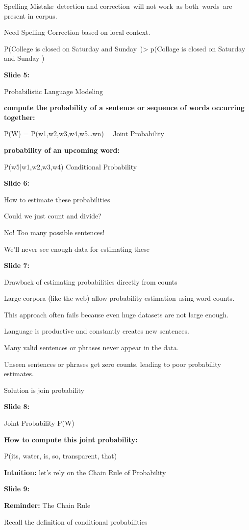 \documentclass[11pt,a4paper]{article}
\begin{document}
Spelling Mistake detection and correction will not work as both words are present in corpus.

Need Spelling Correction based on local context.

P(College is closed on Saturday and Sunday )> p(Collage is closed on Saturday and Sunday )

\textbf{Slide 5:}

Probabilistic Language Modeling

\textbf{compute the probability of a sentence or sequence of words occurring together:} 

P(W) = P(w1,w2,w3,w4,w5…wn)   Joint Probability

\textbf{probability of an upcoming word:} 

P(w5|w1,w2,w3,w4) Conditional Probability

\textbf{Slide 6:}

How to estimate these probabilities

Could we just count and divide?

No!  Too many possible sentences!

We’ll never see enough data for estimating these

\textbf{Slide 7:}

Drawback of estimating probabilities directly from counts

Large corpora (like the web) allow probability estimation using word counts.

This approach often fails because even huge datasets are not large enough.

Language is productive and constantly creates new sentences.

Many valid sentences or phrases never appear in the data.

Unseen sentences or phrases get zero counts, leading to poor probability estimates.

Solution is join probability

\textbf{Slide 8:}

Joint Probability  P(W)

\textbf{How to compute this joint probability:} 

P(its, water, is, so, transparent, that)

\textbf{Intuition:}  let’s rely on the Chain Rule of Probability

\textbf{Slide 9:}

\textbf{Reminder:}  The Chain Rule

Recall the definition of conditional probabilities
\end{document}
